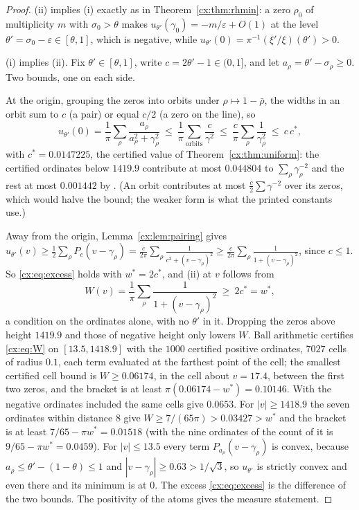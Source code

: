 \begin{proof}
(ii) implies (i) exactly as in Theorem~\ref{cx:thm:rhmin}: a zero $\rho_0$ of multiplicity $m$ with $\sigma_0>\theta$ makes $u_{\theta'}(\gamma_0)=-m/\varepsilon+O(1)$ at the level $\theta'=\sigma_0-\varepsilon\in[\theta,1]$, which is negative, while $u_{\theta'}(0)=\pi^{-1}(\xi'/\xi)(\theta')>0$.

(i) implies (ii). Fix $\theta'\in[\theta,1]$, write $c=2\theta'-1\in(0,1]$, and let $a_\rho=\theta'-\sigma_\rho\ge0$. Two bounds, one on each side.

At the origin, grouping the zeros into orbits under $\rho\mapsto1-\bar\rho$, the widths in an orbit sum to $c$ (a pair) or equal $c/2$ (a zero on the line), so
\[
u_{\theta'}(0)=\frac1\pi\sum_\rho\frac{a_\rho}{a_\rho^2+\gamma_\rho^2}\ \le\ \frac1\pi\sum_{\text{orbits}}\frac{c}{\gamma^2}\ \le\ \frac c\pi\sum_\rho\frac1{\gamma_\rho^2}\ \le\ c\,c^*,
\]
with $c^*=0.0147225$, the certified value of Theorem~\ref{cx:thm:uniform}: the certified ordinates below $1419.9$ contribute at most $0.044804$ to $\sum_\rho\gamma_\rho^{-2}$ and the rest at most $0.001442$ by \cite{HSW22}. (An orbit contributes at most $\tfrac c2\sum\gamma^{-2}$ over its zeros, which would halve the bound; the weaker form is what the printed constants use.)

Away from the origin, Lemma~\ref{cx:lem:pairing} gives $u_{\theta'}(v)\ge\tfrac12\sum_\rho P_c(v-\gamma_\rho)=\frac{c}{2\pi}\sum_\rho\frac1{c^2+(v-\gamma_\rho)^2}\ge\frac{c}{2\pi}\sum_\rho\frac1{1+(v-\gamma_\rho)^2}$, since $c\le1$. So \eqref{cx:eq:excess} holds with $w^*=2c^*$, and (ii) at $v$ follows from
\begin{equation}\label{cx:eq:W}
W(v)=\frac1\pi\sum_\rho\frac1{1+(v-\gamma_\rho)^2}\ \ge\ 2c^*=w^*,
\end{equation}
a condition on the ordinates alone, with no $\theta'$ in it. Dropping the zeros above height $1419.9$ and those of negative height only lowers $W$. Ball arithmetic certifies \eqref{cx:eq:W} on $[13.5,1418.9]$ with the $1000$ certified positive ordinates, $7027$ cells of radius $0.1$, each term evaluated at the farthest point of the cell; the smallest certified cell bound is $W\ge0.06174$, in the cell about $v=17.4$, between the first two zeros, and the bracket is at least $\pi(0.06174-w^*)=0.10146$. With the negative ordinates included the same cells give $0.0653$. For $|v|\ge1418.9$ the seven ordinates within distance $8$ give $W\ge7/(65\pi)>0.03427>w^*$ and the bracket is at least $7/65-\pi w^*=0.01518$ (with the nine ordinates of the count of \cite{HSW22} it is $9/65-\pi w^*=0.0459$). For $|v|\le13.5$ every term $P_{a_\rho}(v-\gamma_\rho)$ is convex, because $a_\rho\le\theta'-(1-\theta)\le1$ and $|v-\gamma_\rho|\ge0.63>1/\sqrt3$, so $u_{\theta'}$ is strictly convex and even there and its minimum is at $0$. The excess \eqref{cx:eq:excess} is the difference of the two bounds. The positivity of the atoms gives the measure statement.
\end{proof}

